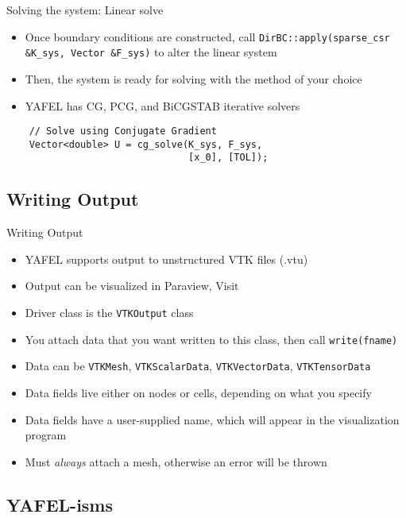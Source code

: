 \begin{frame}[fragile]{Solving the system: Linear solve}
  \begin{itemize}
  \item
    Once boundary conditions are constructed, call
    \texttt{DirBC::apply(sparse\_csr \&K\_sys, Vector \&F\_sys)}
    to alter the linear system
  \item
    Then, the system is ready for solving with the method of your choice
  \item
    YAFEL has CG, PCG, and BiCGSTAB iterative solvers
  \end{itemize}
  \begin{lstlisting}
    // Solve using Conjugate Gradient
    Vector<double> U = cg_solve(K_sys, F_sys, 
                                [x_0], [TOL]);
  \end{lstlisting}
\end{frame}

\subsection{Writing Output}

\begin{frame}{Writing Output}
  
  \begin{itemize}
  \item
    YAFEL supports output to unstructured VTK files (.vtu)
  \item
    Output can be visualized in Paraview, Visit
  \item
    Driver class is the \texttt{VTKOutput} class
  \item
    You attach data that you want written to this class, then call \texttt{write(fname)}
  \item
    Data can be \texttt{VTKMesh}, 
    \texttt{VTKScalarData}, 
    \texttt{VTKVectorData}, 
    \texttt{VTKTensorData}
  \item
    Data fields live either on nodes or cells, depending on what you specify
  \item
    Data fields have a user-supplied name, which will appear in the visualization program
  \item
    Must \emph{always} attach a mesh, otherwise an error will be thrown
  \end{itemize}
  
\end{frame}

\subsection{YAFEL-isms}

